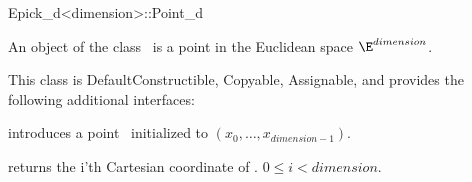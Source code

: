 \begin{ccRefClass} {Epick_d<dimension>::Point_d}

\ccDefinition
An object of the class \ccRefName\ is a point in the Euclidean space $\E^{dimension}$.

This class is DefaultConstructible, Copyable, Assignable, and provides the following additional interfaces:

\ccCreation
{}
{introduces a point \ccVar\ initialized to $(x_0, \ldots, x_{dimension-1})$.}

\ccOperations
{}
       {returns the i'th Cartesian coordinate of \ccVar.
        \ccPrecond $0\leq i < dimension$.}

\end{ccRefClass}
